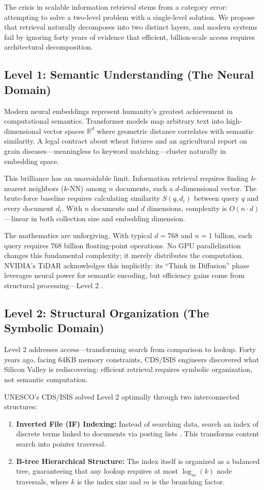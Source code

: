 \documentclass[manuscript,screen,nonacm]{acmart}
\begin{document}
The crisis in scalable information retrieval stems from a category error: attempting to solve a two-level problem with a single-level solution. We propose that retrieval naturally decomposes into two distinct layers, and modern systems fail by ignoring forty years of evidence that efficient, billion-scale access requires architectural decomposition.

\subsection{Level 1: Semantic Understanding (The Neural Domain)}
Modern neural embeddings represent humanity's greatest achievement in computational semantics. Transformer models map arbitrary text into high-dimensional vector spaces $\mathbb{R}^d$ where geometric distance correlates with semantic similarity. A legal contract about wheat futures and an agricultural report on grain diseases---meaningless to keyword matching---cluster naturally in embedding space.

This brilliance has an unavoidable limit. Information retrieval requires finding $k$-nearest neighbors ($k$-NN) among $n$ documents, each a $d$-dimensional vector. The brute-force baseline requires calculating similarity $S(q, d_i)$ between query $q$ and every document $d_i$. With $n$ documents and $d$ dimensions, complexity is $O(n \cdot d)$---linear in both collection size and embedding dimension.

The mathematics are unforgiving. With typical $d=768$ and $n=1$ billion, each query requires 768 billion floating-point operations. No GPU parallelization changes this fundamental complexity; it merely distributes the computation. NVIDIA's TiDAR acknowledges this implicitly: its ``Think in Diffusion'' phase leverages neural power for semantic encoding, but efficiency gains come from structural processing---Level 2 \cite{liu2024}.

\subsection{Level 2: Structural Organization (The Symbolic Domain)}
Level 2 addresses access---transforming search from comparison to lookup. Forty years ago, facing 64KB memory constraints, CDS/ISIS engineers discovered what Silicon Valley is rediscovering: efficient retrieval requires symbolic organization, not semantic computation.

UNESCO's CDS/ISIS solved Level 2 optimally through two interconnected structures:
\begin{enumerate}
    \item \textbf{Inverted File (IF) Indexing:} Instead of searching data, search an index of discrete terms linked to documents via posting lists \cite{zobel2006}. This transforms content search into pointer traversal.
    \item \textbf{B-tree Hierarchical Structure:} The index itself is organized as a balanced tree, guaranteeing that any lookup requires at most $\log_m(k)$ node traversals, where $k$ is the index size and $m$ is the branching factor.
\end{enumerate}
\end{document}
